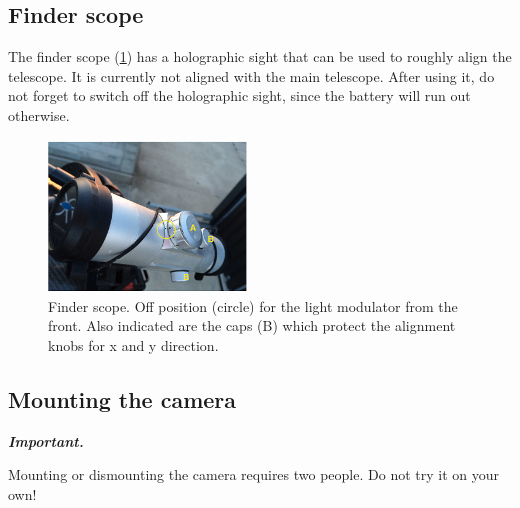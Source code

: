 \documentclass[a4paper, 11pt, fleqn]{memoir}
\newenvironment{important}{
    \begin{propBox}
        \textcolor{oneblue}{\textbf{\textit{Important.}}}
        }{
    \end{propBox}
}
\begin{document}
\subsection{Finder scope}
The finder scope (\cref{fig:finder-scope}) has a holographic sight that can be used to roughly align the telescope.
It is currently not aligned with the main telescope.
After using it, do not forget to switch off the holographic sight, since the battery will run out otherwise.

\begin{figure}[t!]
    \centering
    \includegraphics[width=0.47\textwidth]{finder-scope}
    \caption{Finder scope.
        Off position (circle) for the light modulator from the front.
        Also indicated are the caps (B) which protect the alignment knobs for x and y direction.
    }
    \label{fig:finder-scope}
\end{figure}

\subsection{Mounting the camera}
\label{sec:install-camera}

\begin{important}
    Mounting or dismounting the camera requires two people.
    Do not try it on your own!
\end{important}
\end{document}
